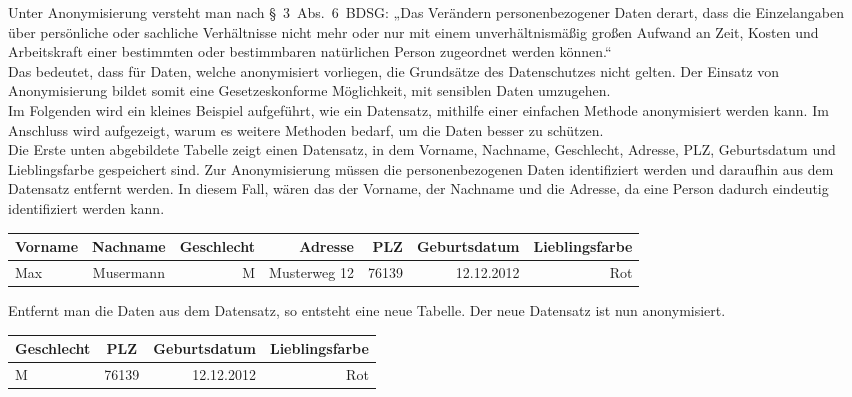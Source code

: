 \documentclass[a4paper, 12pt]{article}
\begin{document}
Unter Anonymisierung versteht man nach §~3~Abs.~6~BDSG: „Das Verändern personenbezogener Daten derart, dass die Einzelangaben über persönliche oder sachliche Verhältnisse nicht mehr oder nur mit einem unverhältnismäßig großen Aufwand an Zeit, Kosten und Arbeitskraft einer bestimmten oder bestimmbaren natürlichen Person zugeordnet werden können.“ \\

\noindent Das bedeutet, dass für Daten, welche anonymisiert vorliegen, die Grundsätze des Datenschutzes nicht gelten. Der Einsatz von Anonymisierung bildet somit eine Gesetzeskonforme Möglichkeit, mit sensiblen Daten umzugehen. \\

\noindent Im Folgenden wird ein kleines Beispiel aufgeführt, wie ein Datensatz, mithilfe einer einfachen Methode anonymisiert werden kann. Im Anschluss wird aufgezeigt, warum es weitere Methoden bedarf, um die Daten besser zu schützen. \\

\noindent Die Erste unten abgebildete Tabelle zeigt einen Datensatz, in dem Vorname, Nachname, Geschlecht, Adresse, PLZ, Geburtsdatum und Lieblingsfarbe gespeichert sind. Zur Anonymisierung müssen die personenbezogenen Daten identifiziert werden und daraufhin aus dem Datensatz entfernt werden. In diesem Fall, wären das der Vorname, der Nachname und die Adresse, da eine Person dadurch eindeutig identifiziert werden kann.

\vspace{10mm}
\begin{tabular}{lcrrrrr}
	Vorname & Nachname & Geschlecht & Adresse & PLZ & Geburtsdatum & Lieblingsfarbe\\
	\hline
	Max & Musermann & M & Musterweg 12 & 76139 & 12.12.2012 & Rot
	
\end{tabular}
\vspace{10mm}

Entfernt man die Daten aus dem Datensatz, so entsteht eine neue Tabelle. Der neue Datensatz ist nun anonymisiert. \\

\begin{tabular}{lcrr}
	
	Geschlecht & PLZ & Geburtsdatum & Lieblingsfarbe\\
	\hline
	M & 76139 & 12.12.2012 & Rot
	
\end{tabular}
\vspace{10mm}
\end{document}
